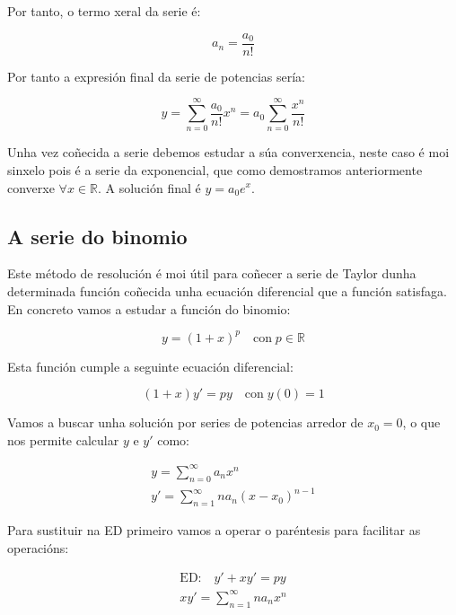 \documentclass[a4paper,12pt,titlepage]{article}
\begin{document}
Por tanto, o termo xeral da serie é:

\begin{equation*}
    a_n=\frac{a_0}{n!}
\end{equation*}

Por tanto a expresión final da serie de potencias sería:

\begin{equation*}
    y = \sum_{n=0}^{\infty} \frac{a_0}{n!}x^n = a_0 \sum_{n=0}^{\infty} \frac{x^n}{n!}
\end{equation*}

Unha vez coñecida a serie debemos estudar a súa converxencia, neste caso é moi sinxelo pois é a serie da exponencial, que como demostramos anteriormente converxe $\forall x \in \mathbb{R}$. A solución final é $y = a_0e^x$.

\subsection{A serie do binomio}

Este método de resolución é moi útil para coñecer a serie de Taylor dunha determinada función coñecida unha ecuación diferencial que a función satisfaga. En concreto vamos a estudar a función do binomio:

\begin{equation*}
    y = (1+x)^p \quad \text{con} \; p\in\mathbb{R}
\end{equation*}

Esta función cumple a seguinte ecuación diferencial:

\begin{equation*}
    (1+x)y'=py \quad \text{con} \; y(0)=1
\end{equation*}

Vamos a buscar unha solución por series de potencias arredor de $x_0=0$, o que nos permite calcular $y$ e $y'$ como:

\begin{equation*}
    \begin{gathered}
        y = \sum_{n=0}^{\infty} a_nx^n \\
        y' = \sum_{n=1}^{\infty} na_n(x-x_0)^{n-1}
    \end{gathered}
\end{equation*}

Para sustituir na ED primeiro vamos a operar o paréntesis para facilitar as operacións:

\begin{equation*}
    \begin{gathered}
        \text{ED:} \quad y' +xy'=py \\
        xy' = \sum_{n=1}^{\infty} na_nx^n
    \end{gathered}
\end{equation*}
\end{document}
